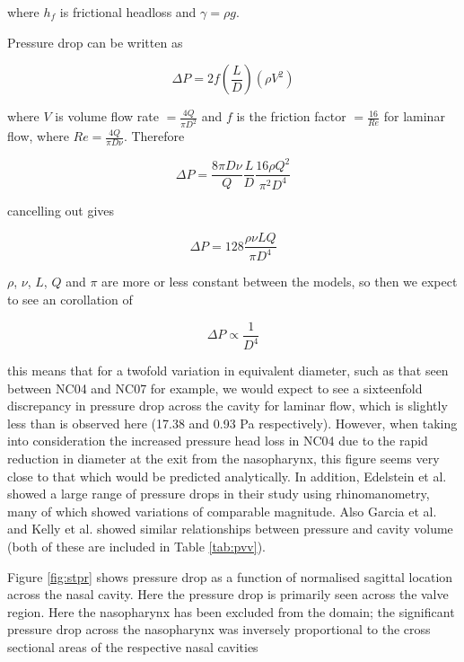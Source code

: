   where $h_f$ is frictional headloss and $\gamma = \rho g$.


Pressure drop can be written as

\begin{equation} \label{eq:1}
  \Delta P = 2f(\frac{L}{D})(\rho V^2)
\end{equation}

where $V$ is volume flow rate $= \frac{4Q}{\pi D^2}$ and $f$ is the friction factor $=\frac{16}{Re}$ for laminar flow, where $Re = \frac{4Q}{\pi D \nu}$. Therefore

\begin{equation}
  \Delta P = \frac{8\pi D \nu}{Q}\frac{L}{D}\frac{16\rho Q^2}{\pi^2D^4}
\end{equation}

cancelling out gives

\begin{equation}
  \Delta P = 128 \frac{\rho \nu L Q}{\pi D^4}
\end{equation}

$\rho$, $\nu$, $L$, $Q$ and $\pi$ are more or less constant between the models, so then we expect to see an corollation of

\begin{equation} \label{corollation}
  \Delta P \propto \frac{1}{D^4}
\end{equation}

this means that for a twofold variation in equivalent diameter, such as that seen between NC04 and NC07 for example, we would expect to see a sixteenfold discrepancy in pressure drop across the cavity for laminar flow, which is slightly less than is observed here (17.38 and 0.93 Pa respectively). However, when taking into consideration the increased pressure head loss in NC04 due to the rapid reduction in diameter at the exit from the nasopharynx, this figure seems very close to that which would be predicted analytically.
In addition, Edelstein et al. \cite{Edelstein1996} showed a large range of pressure drops in their study using rhinomanometry, many of which showed variations of comparable magnitude. Also Garcia et al. \cite{Garcia2007} and Kelly et al. \cite{Kelly2004} showed similar relationships between pressure and cavity volume (both of these are included in Table \ref{tab:pvv}).

Figure \ref{fig:stpr} shows pressure drop as a function of normalised sagittal location across the nasal cavity. Here the pressure drop is primarily seen across the valve region. Here the nasopharynx has been excluded from the domain; the significant pressure drop across the nasopharynx was inversely proportional to the cross sectional areas of the respective nasal cavities



